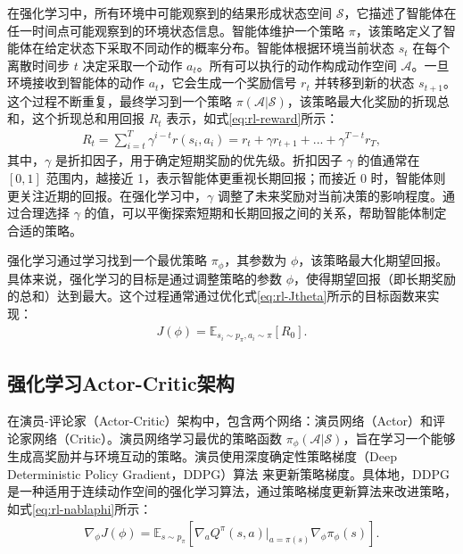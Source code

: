 在强化学习中，所有环境中可能观察到的结果形成状态空间 $\mathcal{S}$，它描述了智能体在任一时间点可能观察到的环境状态信息。智能体维护一个策略 $\pi$，该策略定义了智能体在给定状态下采取不同动作的概率分布。智能体根据环境当前状态 $s_t$ 在每个离散时间步 $t$ 决定采取一个动作 $a_t$。所有可以执行的动作构成动作空间 $\mathcal{A}$。一旦环境接收到智能体的动作 $a_t$，它会生成一个奖励信号 $r_t$ 并转移到新的状态 $s_{t+1}$。这个过程不断重复，最终学习到一个策略 $\pi(\mathcal{A}|\mathcal{S})$，该策略最大化奖励的折现总和，这个折现总和用回报 $R_t$ 表示，如式\eqref{eq:rl-reward}所示：
\begin{equation}
\begin{aligned}
    R_t = \sum_{i=t}^{T}\gamma^{i-t}r(s_i,a_i) = r_t + \gamma r_{t+1} + ... + \gamma^{T-t}r_T,
\end{aligned}
\label{eq:rl-reward}
\end{equation}
其中，$\gamma$ 是折扣因子，用于确定短期奖励的优先级。折扣因子 $\gamma$ 的值通常在 $[0, 1]$ 范围内，越接近 1，表示智能体更重视长期回报；而接近 0 时，智能体则更关注近期的回报。在强化学习中，$\gamma$ 调整了未来奖励对当前决策的影响程度。通过合理选择 $\gamma$ 的值，可以平衡探索短期和长期回报之间的关系，帮助智能体制定合适的策略。

强化学习通过学习找到一个最优策略 $\pi_\phi$，其参数为 $\phi$，该策略最大化期望回报。具体来说，强化学习的目标是通过调整策略的参数 $\phi$，使得期望回报（即长期奖励的总和）达到最大。这个过程通常通过优化式\eqref{eq:rl-Jtheta}所示的目标函数来实现：
\begin{equation}
\begin{aligned}
    J(\phi) = \mathbb{E}_{s_i \sim p_\pi, a_i \sim \pi}[R_0].
\end{aligned}
\label{eq:rl-Jtheta}
\end{equation} 

\subsection{强化学习Actor-Critic架构}
在演员-评论家（Actor-Critic）架构中，包含两个网络：演员网络（Actor）和评论家网络（Critic）。演员网络学习最优的策略函数 $\pi_\phi(\mathcal{A}|\mathcal{S})$，旨在学习一个能够生成高奖励并与环境互动的策略。演员使用深度确定性策略梯度（Deep Deterministic Policy Gradient，DDPG）算法 \cite{silver2014deterministic} 来更新策略梯度。具体地，DDPG 是一种适用于连续动作空间的强化学习算法，通过策略梯度更新算法来改进策略，如式\eqref{eq:rl-nablaphi}所示：
\begin{equation}
\begin{aligned}
    \nabla_\phi J(\phi)=\mathbb{E}_{s\sim p_\pi}\left[\nabla_aQ^{\pi}(s,a)|_{a=\pi(s)}\nabla_\phi\pi_\phi(s)\right].
\end{aligned}
\label{eq:rl-nablaphi}
\end{equation} 

